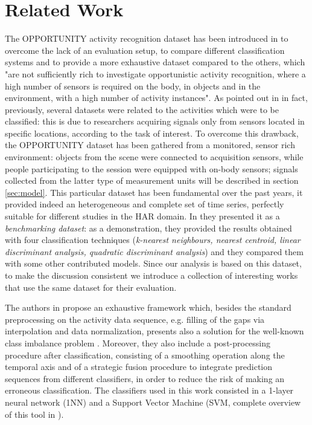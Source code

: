 
\section{Related Work}
\label{sec:related_work}
The OPPORTUNITY activity recognition dataset has been introduced in \cite{ComplexAct-2010} to overcome the lack of an evaluation setup, to compare different classification systems and to provide a more exhaustive dataset compared to the others, which  "are not sufficiently rich to investigate opportunistic activity recognition, where a high number of sensors is required on the body, in objects and in the environment, with a high number of activity instances". As pointed out in \cite{Chavarriaga2013} in fact, previously, several datasets were related to the activities which were to be classified: this is due to researchers acquiring signals only from sensors located in specific locations, according to the task of interest.
To overcome this drawback, the OPPORTUNITY dataset has been gathered from a monitored, sensor rich environment: objects from the scene were connected to acquisition sensors, while people participating to the session were equipped with on-body sensors; signals collected from the latter type of measurement units will be described in section \ref{sec:model}. This particular dataset has been fundamental over the past years, it provided indeed an heterogeneous and complete set of time series, perfectly suitable for different studies in the HAR domain. In \cite{Chavarriaga2013} they presented it as a \textit{benchmarking dataset}: as a demonstration, they provided the results obtained with four classification techniques (\textit{k-nearest neighbours, nearest centroid, linear discriminant analysis, quadratic discriminant analysis}) and they compared them with some other contributed models. Since our analysis is based on this dataset, to make the discussion consistent we introduce a collection of interesting works that use the same dataset for their evaluation.

The authors in \cite{cao2012integrated} propose an exhaustive framework which, besides the standard preprocessing on the activity data sequence, e.g. filling of the gaps via interpolation and data normalization, presents also a solution for the well-known class imbalance problem \cite{japkowicz2002class}. Moreover, they also include a post-processing procedure after classification, consisting of a smoothing operation along the temporal axis and of a strategic fusion procedure to integrate prediction sequences from different classifiers, in order to reduce the risk of making an erroneous classification. The classifiers used in this work consisted in a 1-layer neural network (1NN) and a Support Vector Machine (SVM, complete overview of this tool in \cite{hearst1998support}). 

